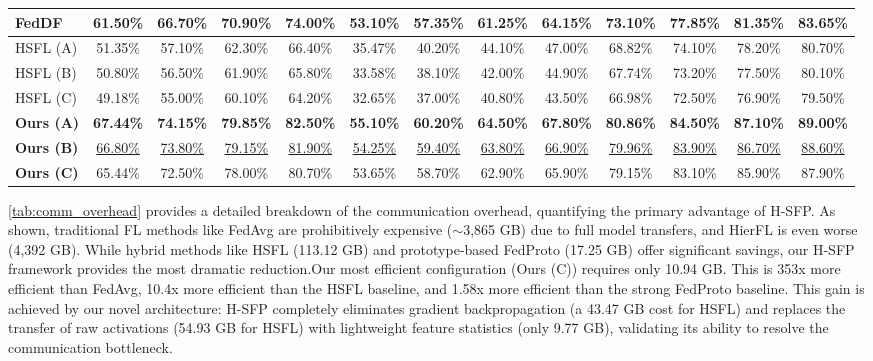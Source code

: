 \begin{table}
{\begin{tabular}{l|cccc|cccc|cccc}
            FedDF & 61.50\% & 66.70\% & 70.90\% & 74.00\% & 53.10\% & 57.35\% & 61.25\% & 64.15\% & 73.10\% & 77.85\% & 81.35\% & 83.65\%\\
            \hline
            HSFL (A) & 51.35\% & 57.10\% & 62.30\% & 66.40\% & 35.47\% & 40.20\% & 44.10\% & 47.00\% & 68.82\% & 74.10\% & 78.20\% & 80.70\%\\
            HSFL (B) & 50.80\% & 56.50\% & 61.90\% & 65.80\% & 33.58\% & 38.10\% & 42.00\% & 44.90\% & 67.74\% & 73.20\% & 77.50\% & 80.10\%\\
            HSFL (C) & 49.18\% & 55.00\% & 60.10\% & 64.20\% & 32.65\% & 37.00\% & 40.80\% & 43.50\% & 66.98\% & 72.50\% & 76.90\% & 79.50\%\\
            \hline
            \textbf{Ours (A)} & \textbf{67.44\%} & \textbf{74.15\%} & \textbf{79.85\%} & \textbf{82.50\%} & \textbf{55.10\%} & \textbf{60.20\%} & \textbf{64.50\%} & \textbf{67.80\%} & \textbf{80.86\%} & \textbf{84.50\%} & \textbf{87.10\%} & \textbf{89.00\%}\\
            \textbf{Ours (B)} & \underline{66.80\%} & \underline{73.80\%} & \underline{79.15\%} & \underline{81.90\%} & \underline{54.25\%} & \underline{59.40\%} & \underline{63.80\%} & \underline{66.90\%} & \underline{79.96\%} & \underline{83.90\%} & \underline{86.70\%} & \underline{88.60\%}\\
            \textbf{Ours (C)} & 65.44\% & 72.50\% & 78.00\% & 80.70\% & 53.65\% & 58.70\% & 62.90\% & 65.90\% & 79.15\% & 83.10\% & 85.90\% & 87.90\%\\
            \hline
        \end{tabular}
    }
    \label{tab:main_robustness_sparsity} 
\end{table}

\cref{tab:comm_overhead} provides a detailed breakdown of the communication overhead, quantifying the primary advantage of H-SFP. As shown, traditional FL methods like FedAvg are prohibitively expensive ($\sim$3,865 GB) due to full model transfers, and HierFL is even worse (4,392 GB). While hybrid methods like HSFL (113.12 GB) and prototype-based FedProto (17.25 GB) offer significant savings, our H-SFP framework provides the most dramatic reduction.Our most efficient configuration (Ours (C)) requires only 10.94 GB. This is 353x more efficient than FedAvg, 10.4x more efficient than the HSFL baseline, and 1.58x more efficient than the strong FedProto baseline. This gain is achieved by our novel architecture: H-SFP completely eliminates gradient backpropagation (a 43.47 GB cost for HSFL) and replaces the transfer of raw activations (54.93 GB for HSFL) with lightweight feature statistics (only 9.77 GB), validating its ability to resolve the communication bottleneck.

